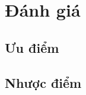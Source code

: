 \section{Đánh giá}
\label{sec:9.2}

\subsection{Ưu điểm}
\label{sec:9.2.1}


\subsection{Nhược điểm}
\label{sec:9.2.2}

